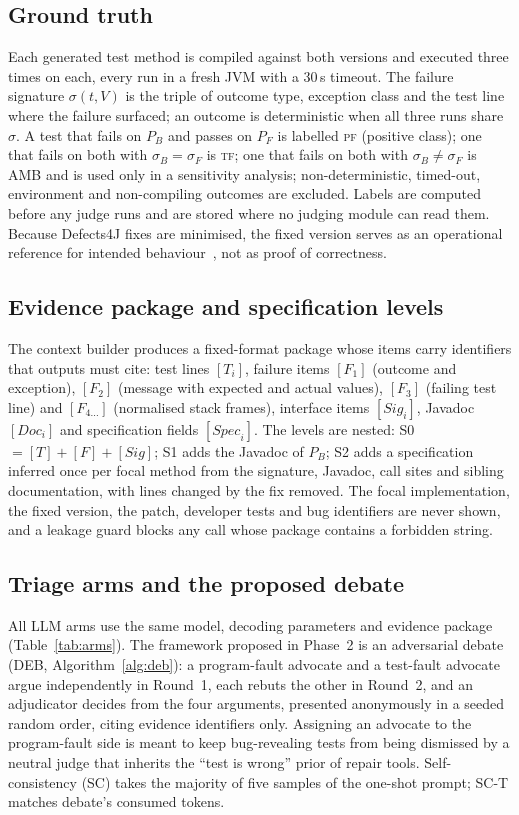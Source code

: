 \documentclass[journal]{IEEEtran}
\newcommand{\PF}{\textsc{pf}}
\newcommand{\TF}{\textsc{tf}}
\begin{document}
\subsection{Ground truth}
Each generated test method is compiled against both versions and executed three times on each, every run in a fresh JVM with a 30\,s timeout. The failure signature $\sigma(t,V)$ is the triple of outcome type, exception class and the test line where the failure surfaced; an outcome is deterministic when all three runs share $\sigma$. A test that fails on $P_B$ and passes on $P_F$ is labelled \PF{} (positive class); one that fails on both with $\sigma_B=\sigma_F$ is \TF; one that fails on both with $\sigma_B\neq\sigma_F$ is AMB and is used only in a sensitivity analysis; non-deterministic, timed-out, environment and non-compiling outcomes are excluded. Labels are computed before any judge runs and are stored where no judging module can read them. Because Defects4J fixes are minimised, the fixed version serves as an operational reference for intended behaviour~\cite{zhao2026misguidance}, not as proof of correctness.



\subsection{Evidence package and specification levels}
The context builder produces a fixed-format package whose items carry identifiers that outputs must cite: test lines $[T_i]$, failure items $[F_1]$ (outcome and exception), $[F_2]$ (message with expected and actual values), $[F_3]$ (failing test line) and $[F_{4\ldots}]$ (normalised stack frames), interface items $[\mathit{Sig}_i]$, Javadoc $[\mathit{Doc}_i]$ and specification fields $[\mathit{Spec}_i]$. The levels are nested: S0 $=[T]+[F]+[\mathit{Sig}]$; S1 adds the Javadoc of $P_B$; S2 adds a specification inferred once per focal method from the signature, Javadoc, call sites and sibling documentation, with lines changed by the fix removed. The focal implementation, the fixed version, the patch, developer tests and bug identifiers are never shown, and a leakage guard blocks any call whose package contains a forbidden string.

\subsection{Triage arms and the proposed debate}
All LLM arms use the same model, decoding parameters and evidence package (Table~\ref{tab:arms}). The framework proposed in Phase~2 is an adversarial debate (DEB, Algorithm~\ref{alg:deb}): a program-fault advocate and a test-fault advocate argue independently in Round~1, each rebuts the other in Round~2, and an adjudicator decides from the four arguments, presented anonymously in a seeded random order, citing evidence identifiers only. Assigning an advocate to the program-fault side is meant to keep bug-revealing tests from being dismissed by a neutral judge that inherits the ``test is wrong'' prior of repair tools. Self-consistency (SC) takes the majority of five samples of the one-shot prompt; SC-T matches debate's consumed tokens.
\end{document}
